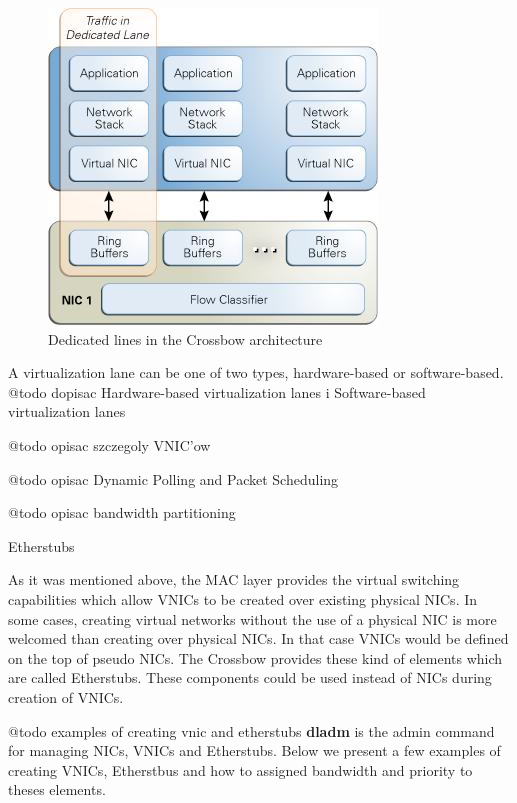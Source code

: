 \documentclass[11pt]{book}
\begin{document}
	\begin{figure}[H]
		\includegraphics[width=\textwidth]{img/crossbow-traffic-line.jpg}
		\caption{Dedicated lines in the Crossbow architecture}
	\end{figure}

        A virtualization lane can be one of two types, hardware-based or software-based.
        @todo dopisac Hardware-based virtualization lanes i Software-based virtualization lanes


        @todo opisac szczegoly VNIC'ow

        @todo opisac Dynamic Polling and Packet Scheduling

        @todo opisac bandwidth partitioning

        Etherstubs

        As it was mentioned above, the MAC layer provides the virtual switching capabilities which allow VNICs to be created over existing physical NICs.
        In some cases, creating virtual networks without the use of a physical NIC is more welcomed than creating over physical NICs. In that case VNICs 
        would be defined on the top of pseudo NICs. The Crossbow provides these kind of elements which are called Etherstubs. These components could be used
        instead of NICs during creation of VNICs.

        @todo examples of creating vnic and etherstubs
        \textbf{dladm} is the admin command for managing NICs, VNICs and Etherstubs. Below we present a few examples of creating VNICs, Etherstbus and how
        to assigned bandwidth and priority to theses elements.
\end{document}
